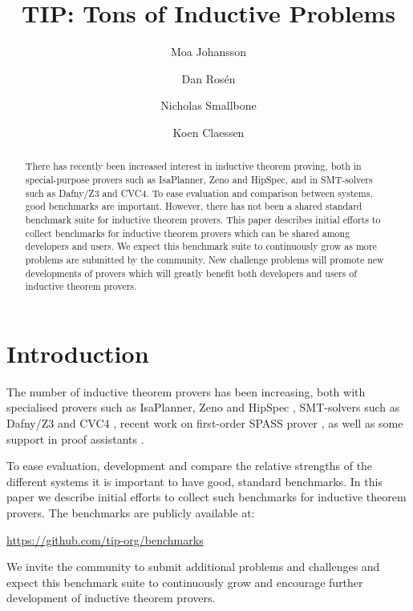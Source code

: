 \documentclass{llncs}
\begin{document}
\title{TIP: Tons of Inductive Problems}

\author{Moa Johansson \and Dan Ros\'en \and Nicholas Smallbone \and Koen Claessen}

\titlerunning{}

\maketitle

\begin{abstract}
There has recently been increased interest in inductive theorem
proving, both in special-purpose provers such as
IsaPlanner, Zeno and HipSpec, and in SMT-solvers such as
Dafny/Z3 and CVC4. To ease evaluation and comparison between systems,
good benchmarks are important. However, there has not been a shared
standard benchmark suite for inductive theorem provers. This paper
describes initial efforts to collect benchmarks for inductive theorem
provers which can be shared among developers and users. 
We expect this benchmark suite to continuously grow as
more problems are submitted by the community. New challenge problems
will promote new developments of provers which will greatly benefit
both developers and users of inductive theorem provers. 

\end{abstract}

\section{Introduction}

The number of inductive theorem provers has been increasing, both with specialised provers such as IsaPlanner, Zeno and HipSpec \cite{dixon2007isaplanner,zeno,hipspecCADE}, SMT-solvers such as Dafny/Z3 and CVC4 \cite{dafny,cvc4}, recent work on first-order SPASS prover \cite{SPASSInduction}, as well as some support in proof assistants \cite{acl2,hipster}. 

To ease evaluation, development and compare the relative strengths of the different systems it is important to have good, standard benchmarks. In this paper we describe initial efforts to collect such benchmarks for inductive theorem provers. The benchmarks are publicly available at: 
\begin{center}
\url{https://github.com/tip-org/benchmarks}
\end{center}
We invite the community to submit additional problems and challenges and expect this benchmark suite to continuously grow and encourage further development of inductive theorem provers. 
\end{document}

